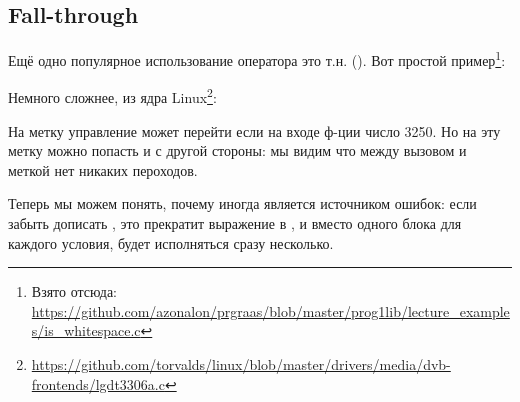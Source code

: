 ﻿\subsection{Fall-through}

Ещё одно популярное использование оператора  это т.н.  ().
Вот простой пример\footnote{Взято отсюда: \url{https://github.com/azonalon/prgraas/blob/master/prog1lib/lecture_examples/is_whitespace.c}}:



Немного сложнее, из ядра Linux\footnote{\url{https://github.com/torvalds/linux/blob/master/drivers/media/dvb-frontends/lgdt3306a.c}}:





На метку  управление может перейти если на входе ф-ции число 3250.
Но на эту метку можно попасть и с другой стороны:
мы видим что между вызовом \printf и меткой  нет никаких пероходов.

Теперь мы можем понять, почему иногда  является источником ошибок: если забыть дописать ,
это прекратит выражение  в , и вместо одного блока для каждого условия,
будет исполняться сразу несколько.

